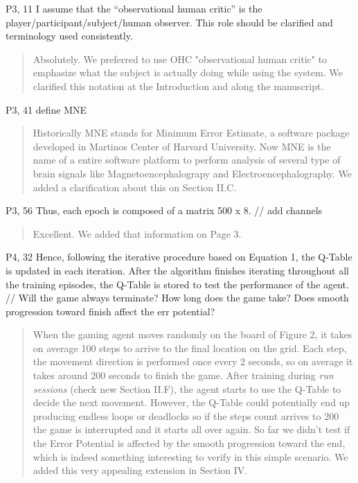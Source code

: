 \documentclass[journal,onecolumn,12pt]{IEEEtran}
\begin{document}
P3, 11 I assume that the “observational human critic” is the player/participant/subject/human observer. This role should be clarified and terminology used consistently.

\vspace{2em}
\begin{quotation}
{\color{blue}
Absolutely.  We preferred to use OHC "observational human critic" to emphasize what the subject is actually doing while using the system.  We clarified this notation at the Introduction and along the manuscript.
}
\end{quotation}
\vspace{2em}

P3, 41 define MNE

\vspace{2em}
\begin{quotation}
{\color{blue}
Historically MNE stands for Minimum Error Estimate, a software package developed in Martinos Center of Harvard University.  Now MNE  is the name of a entire software platform to perform analysis of several type of brain signals like Magnetoencephalograpy and Electroencephalography.  We added a clarification about this on Section II.C.
}
\end{quotation}
\vspace{2em}

P3, 56 Thus, each epoch is composed of a matrix 500 x 8. // add channels

\vspace{2em}
\begin{quotation}
{\color{blue}
Excellent.  We added that information on Page 3.
}
\end{quotation}
\vspace{2em}

P4, 32 Hence, following the iterative procedure based on Equation 1, the Q-Table is updated in each iteration. After the algorithm finishes iterating throughout all the training episodes, the Q-Table is stored to test the performance of the agent.
// Will the game always terminate? How long does the game take? Does smooth progression toward finish affect the err potential?

\vspace{2em}
\begin{quotation}
{\color{blue}

When the gaming agent moves randomly on the board of Figure 2, it takes on average 100 steps to arrive to the final location on the grid.  Each step, the movement direction is performed once every 2 seconds, so on average it takes around 200 seconds to finish the game.  After training during \textit{run sessions} (check new Section II.F), the agent starts to use the Q-Table to decide the next movement.  However, the Q-Table could potentially end up producing endless loops or deadlocks so if the steps count arrives to 200 the game is interrupted and it starts all over again.
So far we didn't test if the Error Potential is affected by the smooth progression toward the end, which is indeed something interesting to verify in this simple scenario.  We added this very appealing extension in Section IV.

}
\end{quotation}
\vspace{2em}
\end{document}
